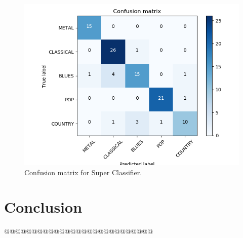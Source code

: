 \begin{figure}
\begin{center}
\includegraphics[scale=0.2]{./figures/confusion_sc.png}
\end{center}
\caption
{
Confusion matrix for Super Classifier.
}
\label{fig:big_picture5}
\end{figure}

\section{Conclusion}\label{sec:conclusion}
@@@@@@@@@@@@@@@@@@@@@@@@@@@

